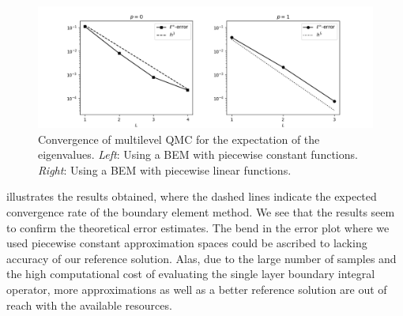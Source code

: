\begin{figure}
    \centering
    \includegraphics[width=\textwidth]{chapter_numerical_results/plots_new_ratio.png}
    \caption{Convergence of multilevel QMC for the expectation of the eigenvalues. \textit{Left}: Using a BEM with piecewise constant functions. \textit{Right}: Using a BEM with piecewise linear functions.}
    \label{fig:plots}
\end{figure}
 illustrates the results obtained, where the dashed lines indicate the expected convergence rate of the boundary element method.
We see that the results seem to confirm the theoretical error estimates.
The bend in the error plot where we used piecewise constant approximation spaces could be ascribed to lacking accuracy of our reference solution.
Alas, due to the large number of samples and the high computational cost of evaluating the single layer boundary integral operator, more approximations as well as a better reference solution are out of reach with the available resources.